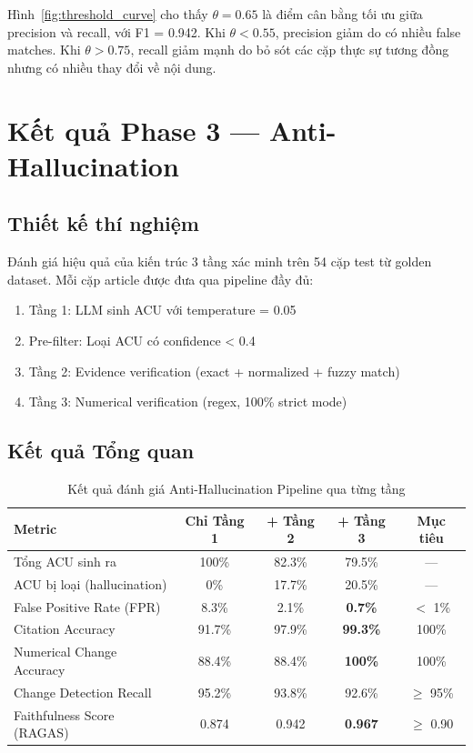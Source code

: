 Hình~\ref{fig:threshold_curve} cho thấy $\theta = 0.65$ là điểm cân bằng tối ưu giữa precision và recall, với F1 = 0.942. Khi $\theta < 0.55$, precision giảm do có nhiều false matches. Khi $\theta > 0.75$, recall giảm mạnh do bỏ sót các cặp thực sự tương đồng nhưng có nhiều thay đổi về nội dung.

\section{Kết quả Phase 3 — Anti-Hallucination}

\subsection{Thiết kế thí nghiệm}

Đánh giá hiệu quả của kiến trúc 3 tầng xác minh trên 54 cặp test từ golden dataset. Mỗi cặp article được đưa qua pipeline đầy đủ:

\begin{enumerate}[label=(\arabic*)]
    \item Tầng 1: LLM sinh ACU với temperature = 0.05
    \item Pre-filter: Loại ACU có confidence < 0.4
    \item Tầng 2: Evidence verification (exact + normalized + fuzzy match)
    \item Tầng 3: Numerical verification (regex, 100\% strict mode)
\end{enumerate}

\subsection{Kết quả Tổng quan}

\begin{table}[H]
    \centering
    \caption{Kết quả đánh giá Anti-Hallucination Pipeline qua từng tầng}
    \label{tab:antihallucination_results}
    \begin{tabularx}{\textwidth}{X c c c c}
        \toprule
        \textbf{Metric} & \textbf{Chỉ Tầng 1} & \textbf{+ Tầng 2} & \textbf{+ Tầng 3} & \textbf{Mục tiêu}\\
        \midrule
        Tổng ACU sinh ra & 100\% & 82.3\% & 79.5\% & —\\
        ACU bị loại (hallucination) & 0\% & 17.7\% & 20.5\% & —\\
        False Positive Rate (FPR) & 8.3\% & 2.1\% & \textbf{0.7\%} & $<$ 1\%\\
        Citation Accuracy & 91.7\% & 97.9\% & \textbf{99.3\%} & 100\%\\
        Numerical Change Accuracy & 88.4\% & 88.4\% & \textbf{100\%} & 100\%\\
        Change Detection Recall & 95.2\% & 93.8\% & 92.6\% & $\geq$ 95\%\\
        Faithfulness Score (RAGAS) & 0.874 & 0.942 & \textbf{0.967} & $\geq$ 0.90\\
        \bottomrule
    \end{tabularx}
\end{table}

